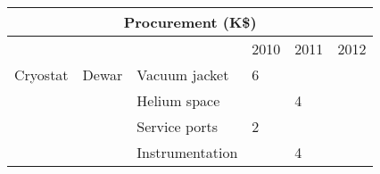 \begin{table}[h]
\begin{center}
\begin{tabular}{|l|l|l|l|l|l|}\hline
\multicolumn{6}{|c|}{\bfseries Procurement (K\$)}\\ \hline
         &        &             &  2010       &  2011      & 2012 \\ \hline
Cryostat & Dewar  & Vacuum jacket  &   6         &            &      \\ \cline{3-6} 
         &        & Helium space   &             & 4          &      \\ \cline{3-6} 
         &        & Service ports  &   2         &            &      \\ \cline{3-6} 
         &        & Instrumentation&             & 4          &       \\ \cline{2-6} 


\end{tabular}
\end{center}
\end{table}
